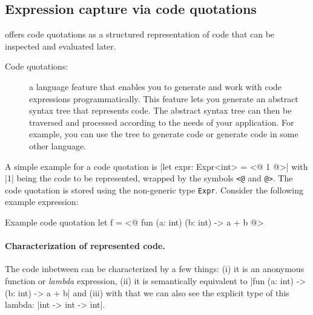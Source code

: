 \subsection{Expression capture via code quotations} %
\label{ssctn:expression-capture-via-code-quotations} %


\fs offers code quotations as a structured representation of code that can be
inspected and evaluated later.

\begin{defpanel}
\begin{description}
    \item[{Code quotations:}] a language feature that enables you to generate
    and work with \fs code expressions programmatically. This feature lets you
    generate an abstract syntax tree that represents \fs code. The abstract
    syntax tree can then be traversed and processed according to the needs of
    your application. For example, you can use the tree to generate \fs code or
    generate code in some other language. \cite{CodeQuot}
\end{description}
\end{defpanel}

\noindent A simple example for a code quotation is \fsharp|let expr: Expr<int> =
<@ 1 @>| with \fsharp|1| being the code to be represented, wrapped by the
symbols \texttt{<@} and \texttt{@>}. The code quotation is stored using the
non-generic type \texttt{Expr}. \cite{FsExpr} Consider the following example
expression:

\begin{codepanel}{Example code quotation}
let f = <@ fun (a: int) (b: int) -> a + b @>
\end{codepanel}

\paragraph{Characterization of represented code.}%
\label{par:characterization-of-represented-code} The code inbetween can be
characterized by a few things: (i) it is an anonymous function or \emph{lambda}
expression, (ii) it is semantically equivalent to \fsharp|fun (a: int) -> (b:
int) -> a + b| and (iii) with that we can also see the explicit type of this
lambda: \fsharp|int -> int -> int|.



